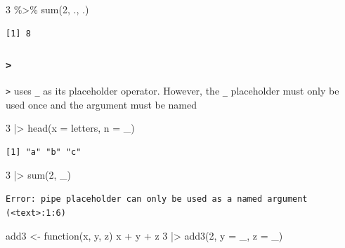 \documentclass[
  letterpaper,
  DIV=11,
  numbers=noendperiod]{scrreprt}
\newenvironment{Shaded}{\begin{snugshade}}{\end{snugshade}}
\newcommand{\AttributeTok}[1]{\textcolor[rgb]{0.40,0.45,0.13}{#1}}
\newcommand{\ControlFlowTok}[1]{\textcolor[rgb]{0.00,0.23,0.31}{#1}}
\newcommand{\DecValTok}[1]{\textcolor[rgb]{0.68,0.00,0.00}{#1}}
\newcommand{\FunctionTok}[1]{\textcolor[rgb]{0.28,0.35,0.67}{#1}}
\newcommand{\NormalTok}[1]{\textcolor[rgb]{0.00,0.23,0.31}{#1}}
\newcommand{\OtherTok}[1]{\textcolor[rgb]{0.00,0.23,0.31}{#1}}
\newcommand{\SpecialCharTok}[1]{\textcolor[rgb]{0.37,0.37,0.37}{#1}}
\begin{document}
\begin{tcolorbox}
\begin{tcolorbox}
\begin{Shaded}
\begin{Highlighting}[]
\DecValTok{3} \SpecialCharTok{\%\textgreater{}\%} \FunctionTok{sum}\NormalTok{(}\DecValTok{2}\NormalTok{, ., .)}
\end{Highlighting}
\end{Shaded}

\begin{verbatim}
[1] 8
\end{verbatim}

\subsubsection{\texorpdfstring{\texttt{\textbar{}\textgreater{}}}{\textbar\textgreater{}}}

\texttt{\textbar{}\textgreater{}} uses \texttt{\_} as its placeholder
operator. However, the \texttt{\_} placeholder must only be used once
and the argument must be named

\begin{Shaded}
\begin{Highlighting}[]
\DecValTok{3} \SpecialCharTok{|\textgreater{}} \FunctionTok{head}\NormalTok{(}\AttributeTok{x =}\NormalTok{ letters, }\AttributeTok{n =}\NormalTok{ \_)}
\end{Highlighting}
\end{Shaded}

\begin{verbatim}
[1] "a" "b" "c"
\end{verbatim}

\begin{Shaded}
\begin{Highlighting}[]
\DecValTok{3} \SpecialCharTok{|\textgreater{}} \FunctionTok{sum}\NormalTok{(}\DecValTok{2}\NormalTok{, \_)}
\end{Highlighting}
\end{Shaded}

\begin{verbatim}
Error: pipe placeholder can only be used as a named argument (<text>:1:6)
\end{verbatim}

\begin{Shaded}
\begin{Highlighting}[]
\NormalTok{add3 }\OtherTok{\textless{}{-}} \ControlFlowTok{function}\NormalTok{(x, y, z) x }\SpecialCharTok{+}\NormalTok{ y }\SpecialCharTok{+}\NormalTok{ z}
\DecValTok{3} \SpecialCharTok{|\textgreater{}} \FunctionTok{add3}\NormalTok{(}\DecValTok{2}\NormalTok{, }\AttributeTok{y =}\NormalTok{ \_, }\AttributeTok{z =}\NormalTok{ \_)}
\end{Highlighting}
\end{Shaded}


\end{tcolorbox}
\end{tcolorbox}
\end{document}
